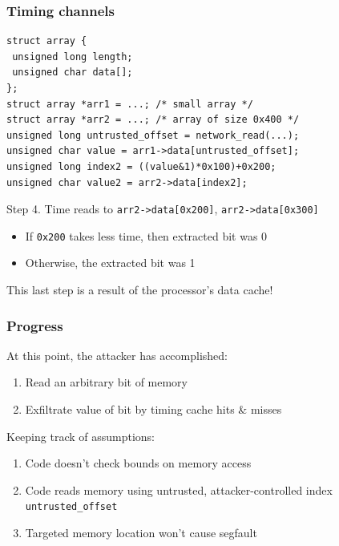 \documentclass[10pt,handout]{beamer}
\begin{document}
\begin{frame}[fragile]

\frametitle{Timing channels}

\begin{lstlisting}[basicstyle=\small,style=customjava]
struct array {
 unsigned long length;
 unsigned char data[];
};
struct array *arr1 = ...; /* small array */
struct array *arr2 = ...; /* array of size 0x400 */
unsigned long untrusted_offset = network_read(...);
unsigned char value = arr1->data[untrusted_offset];
unsigned long index2 = ((value&1)*0x100)+0x200;
unsigned char value2 = arr2->data[index2];
\end{lstlisting}

\begin{center}
Step 4. Time reads to \texttt{arr2->data[0x200]}, \texttt{arr2->data[0x300]}
\pause
\begin{itemize}
\item If \texttt{0x200} takes less time, then extracted bit was 0
\item Otherwise, the extracted bit was 1 \\[1em]
\end{itemize}
\pause
This last step is a result of the processor's data cache!
\end{center}

\end{frame}


\begin{frame}

\frametitle{Progress}

At this point, the attacker has accomplished:
\begin{enumerate}
  \item Read an arbitrary bit of memory
  \item Exfiltrate value of bit by timing cache hits \& misses \\[1em]
\end{enumerate}\pause

Keeping track of assumptions:\pause
\begin{enumerate}
  \item Code doesn't check bounds on memory access
  \item Code reads memory using untrusted, attacker-controlled index \texttt{untrusted\_offset}
  \item Targeted memory location won't cause segfault
\end{enumerate}

\end{frame}
\end{document}
